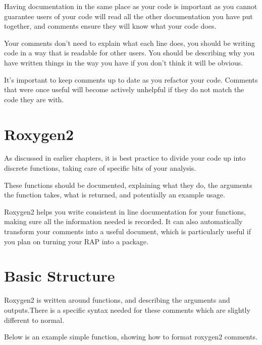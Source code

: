 \documentclass[
  letterpaper,
]{book}
\begin{document}
Having documentation in the same place as your code is important as you
cannot guarantee users of your code will read all the other
documentation you have put together, and comments ensure they will know
what your code does.

Your comments don't need to explain what each line does, you should be
writing code in a way that is readable for other users. You should be
describing why you have written things in the way you have if you don't
think it will be obvious.

It's important to keep comments up to date as you refactor your code.
Comments that were once useful will become actively unhelpful if they do
not match the code they are with.

\hypertarget{roxygen2}{%
\section{Roxygen2}\label{roxygen2}}

As discussed in earlier chapters, it is best practice to divide your
code up into discrete functions, taking care of specific bits of your
analysis.

These functions should be documented, explaining what they do, the
arguments the function takes, what is returned, and potentially an
example usage.

Roxygen2 helps you write consistent in line documentation for your
functions, making sure all the information needed is recorded. It can
also automatically transform your comments into a useful document, which
is particularly useful if you plan on turning your RAP into a package.

\hypertarget{basic-structure}{%
\section{Basic Structure}\label{basic-structure}}

Roxygen2 is written around functions, and describing the arguments and
outputs.There is a specific syntax needed for these comments which are
slightly different to normal.

Below is an example simple function, showing how to format roxygen2
comments.
\end{document}
